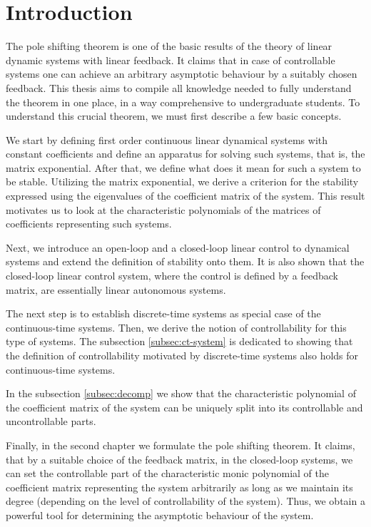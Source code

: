\chapter*{Introduction}

The pole shifting theorem is one of the basic results of the theory of linear dynamic systems with linear feedback. It claims that in case of controllable systems one can achieve an arbitrary asymptotic behaviour by a suitably chosen feedback. This thesis aims to compile all knowledge needed to fully understand the theorem in one place, in a way comprehensive to undergraduate students. To understand this crucial theorem, we must first describe a few basic concepts. 

We start by defining first order continuous linear dynamical systems with constant coefficients and define an apparatus for solving such systems, that is, the matrix exponential. After that, we define what does it mean for such a system to be stable. Utilizing the matrix exponential, we derive a criterion for the stability expressed using the eigenvalues of the coefficient matrix of the system. This result motivates us to look at the characteristic polynomials of the matrices of coefficients representing such systems. 

Next, we introduce an open-loop and a closed-loop linear control to dynamical systems and extend the definition of stability onto them. It is also shown that the closed-loop linear control system, where the control is defined by a feedback matrix, are essentially linear autonomous systems. 

The next step is to establish discrete-time systems as special case of the continuous-time systems. Then, we derive the notion of controllability for this type of systems. The subsection \ref{subsec:ct-system} is dedicated to showing that the definition of controllability motivated by discrete-time systems also holds for continuous-time systems.

In the subsection \ref{subsec:decomp} we show that the characteristic polynomial of the coefficient matrix of the system can be uniquely split into its controllable and uncontrollable parts. 

Finally, in the second chapter we formulate the pole shifting theorem. It claims, that by a suitable choice of the feedback matrix, in the closed-loop systems, we can set the controllable part of the characteristic monic polynomial of the coefficient matrix representing the system arbitrarily as long as we maintain its degree (depending on the level of controllability of the system). Thus, we obtain a powerful tool for determining the asymptotic behaviour of the system.